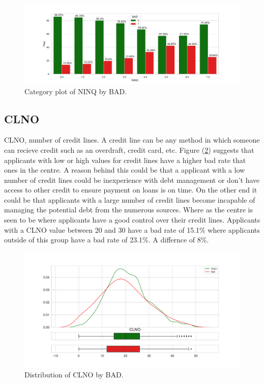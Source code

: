 \begin{figure}[!ht]
	\centering
	\includegraphics[scale=0.40]{figs/ninq_cat.pdf}
	\caption{Category plot of NINQ by BAD. \label{ninq_cat}}
\end{figure}

\subsection*{CLNO}

CLNO,  number of credit lines. A credit line can be any method in which someone can recieve credit such as an overdraft,  credit card,  etc. Figure (\ref{clno_dist}) suggests that applicants with low or high values for credit lines have a higher bad rate that ones in the centre. A reason behind this could be that a applicant with a low number of credit lines could be inexperience with debt management or don't have access to other credit to ensure payment on loans is on time. On the other end it could be that applicants with a large number of credit lines become incapable of managing the potential debt from the numerous sources. Where as the centre is seen to be where applicants have a good control over their credit lines. Applicants with a CLNO value between 20 and 30 have a bad rate of 15.1\% where applicants outside of this group have a bad rate of 23.1\%. A differnce of 8\%.

\begin{figure}[!ht]
	\centering
	\includegraphics[scale=0.40]{figs/clno_dist.pdf}
	\caption{Distribution of CLNO by BAD. \label{clno_dist}}
\end{figure}

